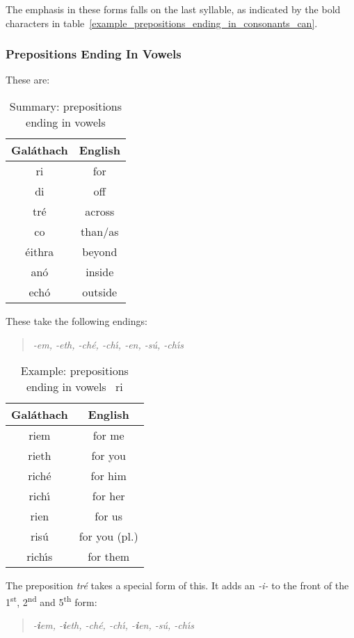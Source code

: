 The emphasis in these forms falls on the last syllable, as indicated by the bold characters in table~\ref{example_prepositions_ending_in_consonants_can}. 

\subsubsection{Prepositions Ending In Vowels}

These are:
\begin{table}[H]
\centering
\begin{tabu}{c|c}
  \textbf{Gal\'{a}thach} & \textbf{English}\\
  \toprule
  ri & for\\
  di & off\\
  tr\'{e} & across\\
  co & than/as\\
  \'{e}ithra & beyond\\
  an\'{o} & inside\\
  ech\'{o} & outside
\end{tabu}
\caption{Summary: prepositions ending in vowels}
\label{summary_prepositions_ending_in_vowels}
\end{table}

These take the following endings:
\begin{quote}
\textit{-em, -eth, -ch\'{e}, -ch\'{\i}, -en, -s\'{u}, -ch\'{\i}s}
\end{quote}

\begin{table}[H]
\centering
\begin{tabu}{c|c}
  \textbf{Gal\'{a}thach} & \textbf{English}\\
  \toprule
  riem & for me\\
  rieth & for you\\
  rich\'{e} & for him\\
  rich\'{\i} & for her\\
  rien & for us\\
  ris\'{u} & for you (pl.)\\
  rich\'{\i}s & for them
\end{tabu}
\caption{Example: prepositions ending in vowels \textendash\ ri}
\label{example_prepositions_ending_in_vowels_ri}
\end{table}

The preposition \textit{tr\'{e}} takes a special form of this. It adds an \textit{-i-} to the front of the 1\textsuperscript{st}, 2\textsuperscript{nd} and 5\textsuperscript{th} form:
\begin{quote}
\textit{-\textbf{i}em, -\textbf{i}eth, -ch\'{e}, -ch\'{\i}, -\textbf{i}en, -s\'{u}, -ch\'{\i}s}
\end{quote}

